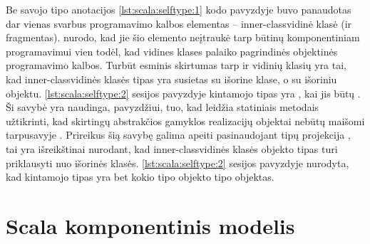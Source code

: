 Be savojo tipo anotacijos \ref{lst:scala:selftype:1} kodo pavyzdyje buvo
panaudotas dar vienas svarbus programavimo kalbos elementas –
\gls{inner-class}{vidinė klasė (ir fragmentas)}.
\cite[12]{scalable-component-abstractions}
nurodo, kad jie šio elemento neįtraukė tarp būtinų komponentiniam
programavimui vien todėl, kad vidines klases palaiko pagrindinės
 objektinės programavimo kalbos. Turbūt esminis
skirtumas tarp  ir  vidinių klasių
yra tai, kad  \gls{inner-class}{vidinės klasės} tipas
yra susietas su išorine klase, o  su išoriniu objektu.
\ref{lst:scala:selftype:2}  sesijos pavyzdyje kintamojo
 tipas yra , kai  jis
būtų . Ši savybė yra naudinga, pavyzdžiui, tuo, kad 
leidžia statiniais metodais užtikrinti, kad skirtingų abstrakčios
gamyklos  realizacijų objektai nebūtų maišomi
tarpusavyje \cite[36]{scala-design-patterns}. Prireikus šią savybę
galima apeiti pasinaudojant tipų projekcija ,
tai yra išreikštinai nurodant, kad \gls{inner-class}{vidinės klasės}
objekto tipas turi priklausyti nuo išorinės klasės.
\ref{lst:scala:selftype:2} sesijos pavyzdyje nurodyta, kad kintamojo
 tipas yra bet kokio  tipo objekto
 tipo objektas.

\section{Scala komponentinis modelis}

